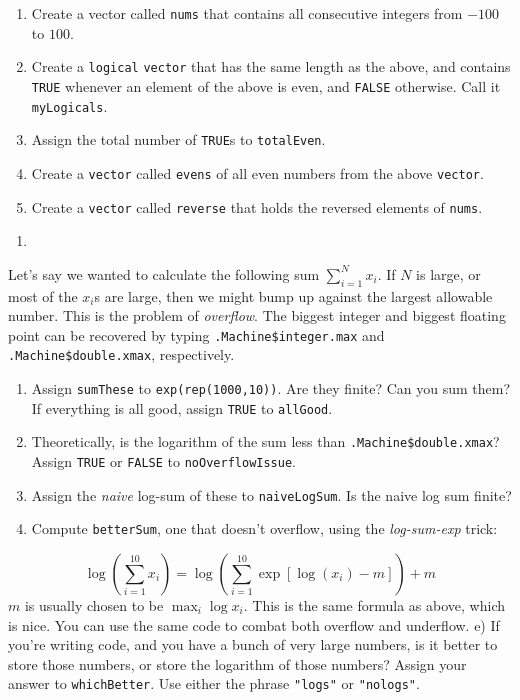 \documentclass[12pt,krantz2]{krantz}
\providecommand{\tightlist}{%
  \setlength{\itemsep}{0pt}\setlength{\parskip}{0pt}}
\begin{document}
\begin{enumerate}
\def\labelenumi{\alph{enumi})}
\tightlist
\item
  Create a vector called \texttt{nums} that contains all consecutive integers from \(-100\) to \(100\).
\item
  Create a \texttt{logical} \texttt{vector} that has the same length as the above, and contains \texttt{TRUE} whenever an element of the above is even, and \texttt{FALSE} otherwise. Call it \texttt{myLogicals}.
\item
  Assign the total number of \texttt{TRUE}s to \texttt{totalEven}.
\item
  Create a \texttt{vector} called \texttt{evens} of all even numbers from the above \texttt{vector}.
\item
  Create a \texttt{vector} called \texttt{reverse} that holds the reversed elements of \texttt{nums}.
\end{enumerate}

\begin{enumerate}
\def\labelenumi{\arabic{enumi}.}
\setcounter{enumi}{3}
\item
\end{enumerate}

Let's say we wanted to calculate the following sum \(\sum_{i=1}^N x_i\). If \(N\) is large, or most of the \(x_i\)s are large, then we might bump up against the largest allowable number. This is the problem of \emph{overflow}. The biggest integer and biggest floating point can be recovered by typing \texttt{.Machine\$integer.max} and \texttt{.Machine\$double.xmax}, respectively.

\begin{enumerate}
\def\labelenumi{\alph{enumi})}
\tightlist
\item
  Assign \texttt{sumThese} to \texttt{exp(rep(1000,10))}. Are they finite? Can you sum them? If everything is all good, assign \texttt{TRUE} to \texttt{allGood}.
\item
  Theoretically, is the logarithm of the sum less than \texttt{.Machine\$double.xmax}? Assign \texttt{TRUE} or \texttt{FALSE} to \texttt{noOverflowIssue}.
\item
  Assign the \emph{naive} log-sum of these to \texttt{naiveLogSum}. Is the naive log sum finite?
\item
  Compute \texttt{betterSum}, one that doesn't overflow, using the \emph{log-sum-exp} trick:
\end{enumerate}

\[
  \log\left( \sum_{i=1}^{10} x_i \right) = \log\left( \sum_{i=1}^{10} \exp[ \log(x_i) - m] \right) + m  
  \]
\(m\) is usually chosen to be \(\max_i \log x_i\). This is the same formula as above, which is nice. You can use the same code to combat both overflow and underflow.
e) If you're writing code, and you have a bunch of very large numbers, is it better to store those numbers, or store the logarithm of those numbers? Assign your answer to \texttt{whichBetter}. Use either the phrase \texttt{"logs"} or \texttt{"nologs"}.
\end{document}
